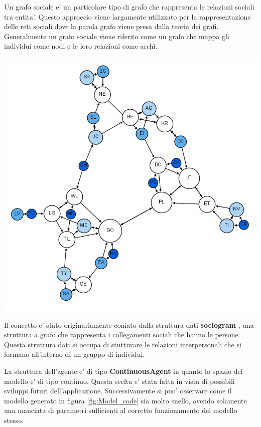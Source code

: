 Un grafo sociale e' un particolare tipo di grafo che rappresenta le relazioni sociali tra entita'.
Questo approccio viene largamente utilizzato per la rappresentazione delle reti sociali dove la 
parola grafo viene presa dalla teoria dei grafi. Generalmente un grafo sociale viene riferito come un
grafo che mappa gli individui come nodi e le loro relazioni come archi. \cite{wiki:Social_graph}

\begin{minipage}{\linewidth}
    \centering
    \includegraphics[width=\textwidth]{img/Moreno_Sociogram_3rd_Grade.png}
    \label{fig:social_graph}
\end{minipage}

Il concetto e' stato originariamente coniato dalla struttura dati \textbf{sociogram} \cite{wiki:Sociogram}, 
una struttura a grafo che rappresenta i collegamenti sociali che hanno le persone. Questa 
struttura dati si occupa di stutturare le relazioni interpersonali che si formano all'interno di un 
gruppo di individui. 

La struttura dell'agente e' di tipo \textbf{ContinuousAgent} in quanto lo 
spazio del modello e' di tipo continuo. Questa scelta e' stata fatta in vista di possibili 
sviluppi futuri dell'applicazione. Successivamente si puo' osservare come il modello generato 
in figura \ref{fig:Model_code} sia molto snello, avendo solamente una manciata di parametri 
sufficienti al corretto funzionamento del modello stesso. 

